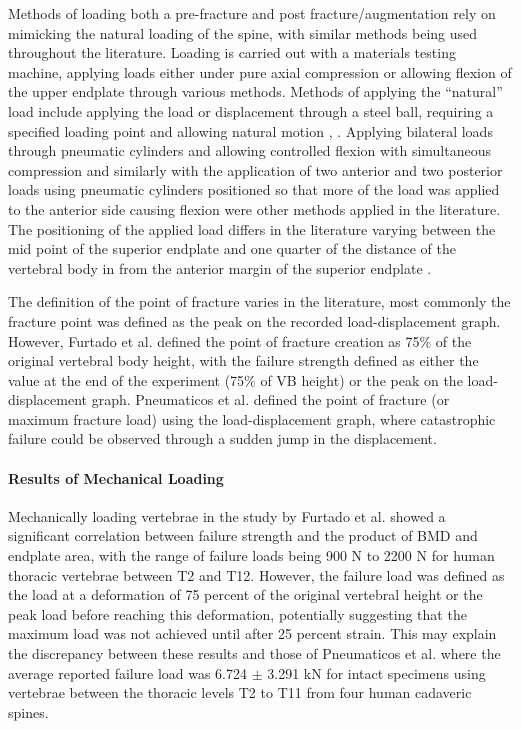 Methods of loading both a pre-fracture and post fracture/augmentation
rely on mimicking the natural loading of the spine, with similar methods
being used throughout the literature. Loading is carried out with a
materials testing machine, applying loads either under pure axial
compression or allowing flexion of the upper endplate through various
methods. Methods of applying the ``natural'' load include applying the
load or displacement through a steel ball, requiring a specified loading
point and allowing natural motion \cite{tarsuslugil2013development},
\cite{furtado2007biomechanical}.
Applying bilateral
loads through pneumatic cylinders and allowing controlled flexion with
simultaneous compression \cite{ananthakrishnan2005effect} and similarly with
the application of
two anterior and two posterior loads using pneumatic cylinders
positioned so that more of the load was applied to the anterior side
causing flexion \cite{pneumaticos2013effect} were other methods applied in the
literature.
The positioning of the applied load differs in the literature varying
between the mid point of the superior endplate \cite{Barr2000} and one quarter
of the distance of the vertebral body in from the anterior margin of the
superior endplate \cite{belkoff2001biomechanics}.

The definition of the point of fracture varies in the literature, most
commonly the fracture point was defined as the peak on the recorded
load-displacement graph. However, Furtado et al. \cite{furtado2007biomechanical} defined the point of
fracture creation as 75\% of the original vertebral body height, with
the failure strength defined as either the value at the end of the
experiment (75\% of VB height) or the peak on the load-displacement
graph. Pneumaticos et al. \cite{pneumaticos2013effect} defined the point of
fracture (or
maximum fracture load) using the load-displacement graph, where
catastrophic failure could be observed through a sudden jump in the
displacement.

\paragraph{Results of Mechanical Loading
}\label{results-of-mechanical-loading}

Mechanically loading vertebrae in the study by Furtado et al. \cite{furtado2007biomechanical} showed a
significant correlation between failure strength and the product of BMD
and endplate area, with the range of failure loads being 900 N to 2200 N
for human thoracic vertebrae between T2 and T12. However, the failure
load was defined as the load at a deformation of 75 percent of the
original vertebral height or the peak load before reaching this
deformation, potentially suggesting that the maximum load was not
achieved until after 25 percent strain. This may explain the discrepancy
between these results and those of Pneumaticos et al.
\cite{pneumaticos2013effect} where the
average reported failure load was 6.724 $\pm$ 3.291 kN for intact specimens
using vertebrae between the thoracic levels T2 to T11 from four human
cadaveric spines.

